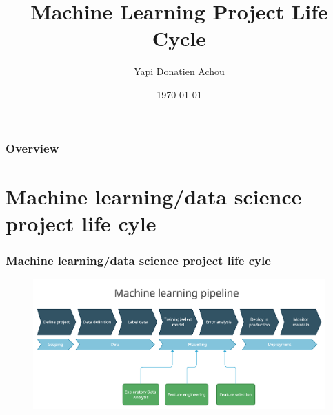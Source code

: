 \documentclass{beamer}
\title{Machine Learning Project Life Cycle} %
\author{Yapi Donatien Achou} %
\institute[Semcon] %
{
Semcon \\ %
\medskip
\textit{yapi-donatien.achou@semcon.com} %
}
\date{\today} %
\begin{document}
\begin{frame}
\titlepage %
\end{frame}

\begin{frame}
\frametitle{Overview} %
\tableofcontents %
\end{frame}



\section{Machine learning/data science project life cyle}
\begin{frame}
\frametitle{Machine learning/data science project life cyle}
\begin{figure}[H] %
   \centering
   \includegraphics[width=5in]{figures/ml-pipeline.png} 
\end{figure}
\end{frame}


\end{document}
